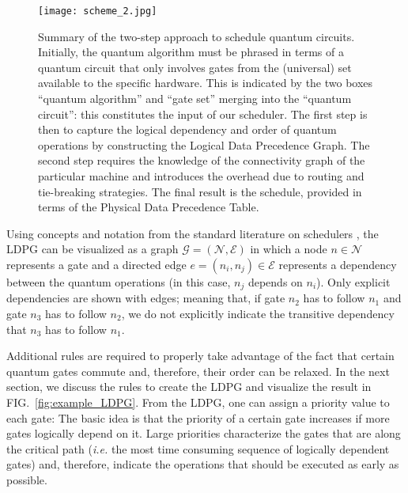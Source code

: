 \documentclass[%
onecolumn,pra,
superscriptaddress,
nofootinbib,
 amsmath,amssymb,
 aps,
11pt,
]{revtex4-1}
\begin{document}
\begin{figure}[b!]
\centering
\texttt{[image: scheme\_2.jpg]}
\caption{Summary of the two-step approach to schedule quantum circuits. Initially, the quantum algorithm must be phrased in terms of a quantum circuit that only involves gates from the (universal) set available to the specific hardware. This is indicated by the two boxes ``quantum algorithm'' and ``gate set'' merging into the ``quantum circuit'': this constitutes the input of our scheduler. The first step is then to capture the logical dependency and order of quantum operations by constructing the Logical Data Precedence Graph. The second step requires the knowledge of the connectivity graph of the particular machine and introduces the overhead due to routing and tie-breaking strategies. The final result is the schedule, provided in terms of the Physical Data Precedence Table.}\label{fig:scheme}
\end{figure}


Using concepts and notation from the standard literature on schedulers \cite{Cooper1998,Ozer1998}, the LDPG can be visualized as a graph $\mathcal{G} = (\mathcal{N},\mathcal{E})$ in which a node $n\in\mathcal{N}$ represents a gate and a directed edge $e=(n_i,n_j)\in\mathcal{E}$ represents a dependency between the quantum operations (in this case, $n_j$ depends on $n_i$). Only explicit dependencies are shown with edges; meaning that, if gate $n_2$ has to follow $n_1$ and gate $n_3$ has to follow $n_2$, we do not explicitly indicate the transitive dependency that $n_3$ has to follow $n_1$.

Additional rules are required to properly take advantage of the fact that certain quantum gates commute and, therefore, their order can be relaxed. In the next section, %
we discuss the rules to create the LDPG and visualize the result in FIG.~\ref{fig:example_LDPG}. From the LDPG, one can assign a priority value to each gate: The basic idea is that the priority of a certain gate increases if more gates logically depend on it. Large priorities characterize the gates that are along the critical path (\emph{i.e.} the most time consuming sequence of logically dependent gates) and, therefore, indicate the operations that should be executed as early as possible.
\end{document}
